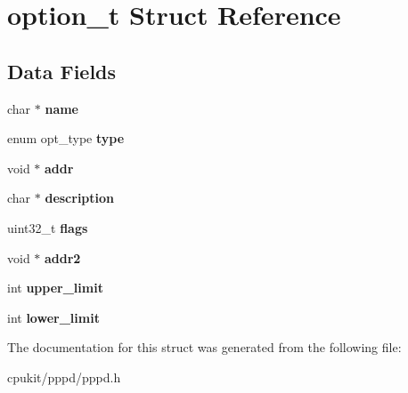 \hypertarget{structoption__t}{}\section{option\+\_\+t Struct Reference}
\label{structoption__t}
\subsection*{Data Fields}
\begin{DoxyCompactItemize}
\item 
\mbox{\label{structoption__t_a2c6d4c7bd148d842188cfdc67b6e92a0}} 
char $\ast$ {\bfseries name}
\item 
\mbox{\label{structoption__t_ac07762fbc93997c5fdf7c282b26f0cbc}} 
enum opt\+\_\+type {\bfseries type}
\item 
\mbox{\label{structoption__t_a9a467408fd2d5a20b684857d7485596a}} 
void $\ast$ {\bfseries addr}
\item 
\mbox{\label{structoption__t_a9dddab86236fc794fd1a0f1b865af5ad}} 
char $\ast$ {\bfseries description}
\item 
\mbox{\label{structoption__t_aa904e6b73fd9e76e98192f9b25a492d7}} 
uint32\+\_\+t {\bfseries flags}
\item 
\mbox{\label{structoption__t_ae87750f3022b417aacaf622256c3a8aa}} 
void $\ast$ {\bfseries addr2}
\item 
\mbox{\label{structoption__t_a9cfce6dd73d14a3d492bd3db1a19a907}} 
int {\bfseries upper\+\_\+limit}
\item 
\mbox{\label{structoption__t_ab485a136cefc775349720e1f95c35ae5}} 
int {\bfseries lower\+\_\+limit}
\end{DoxyCompactItemize}


The documentation for this struct was generated from the following file\+:\begin{DoxyCompactItemize}
\item 
cpukit/pppd/pppd.\+h\end{DoxyCompactItemize}

